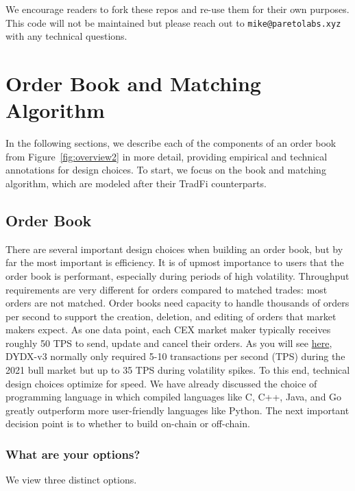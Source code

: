 \documentclass{article}
\begin{document}
\noindent We encourage readers to fork these repos and re-use them for their own purposes. This code will not be maintained but please reach out to \texttt{mike@paretolabs.xyz} with any technical questions.

\section{Order Book and Matching Algorithm}

In the following sections, we describe each of the components of an order book from Figure~\ref{fig:overview2} in more detail, providing empirical and technical annotations for design choices. To start, we focus on the book and matching algorithm, which are modeled after their TradFi counterparts.

\subsection{Order Book}

\noindent There are several important design choices when building an order book, but by far the most important is efficiency. It is of upmost importance to users that the order book is performant, especially during periods of high volatility.
Throughput requirements are very different for orders compared to matched trades: most orders are not matched. 
Order books need capacity to handle thousands of orders per second to support the creation, deletion, and editing of orders that market makers expect.
As one data point, each CEX market maker typically receives roughly 50 TPS to send, update and cancel their orders. As you will see \href{https://twitter.com/EliBenSasson/status/1458813552446345226/photo/1}{here}, DYDX-v3 normally only required 5-10 transactions per second (TPS) during the 2021 bull market but up to 35 TPS during volatility spikes. 
To this end, technical design choices optimize for speed. We have already discussed the choice of programming language in which compiled languages like C, C++, Java, and Go greatly outperform more user-friendly languages like Python. 
The next important decision point is to whether to build on-chain or off-chain.

\subsubsection{What are your options?}

We view three distinct options.
\end{document}
